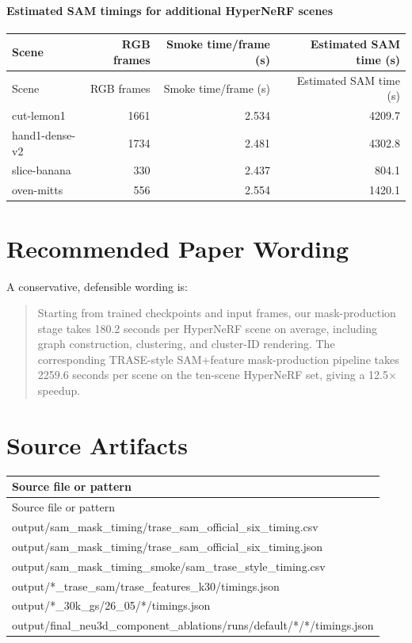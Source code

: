 \documentclass[10pt]{article}
\begin{document}
\paragraph{Estimated SAM timings for additional HyperNeRF scenes}
\small
\begin{longtable}{lrrr}
\toprule
Scene & RGB frames & Smoke time/frame (s) & Estimated SAM time (s) \\
\midrule
\endfirsthead
\toprule
Scene & RGB frames & Smoke time/frame (s) & Estimated SAM time (s) \\
\midrule
\endhead
cut-lemon1 & 1661 & 2.534 & 4209.7 \\
hand1-dense-v2 & 1734 & 2.481 & 4302.8 \\
slice-banana & 330 & 2.437 & 804.1 \\
oven-mitts & 556 & 2.554 & 1420.1 \\
\bottomrule
\end{longtable}
\normalsize

\section{Recommended Paper Wording}
A conservative, defensible wording is:

\begin{quote}
Starting from trained checkpoints and input frames, our mask-production stage takes 180.2 seconds per HyperNeRF scene on average, including graph construction, clustering, and cluster-ID rendering.  The corresponding TRASE-style SAM+feature mask-production pipeline takes 2259.6 seconds per scene on the ten-scene HyperNeRF set, giving a 12.5$\times$ speedup.
\end{quote}

\section{Source Artifacts}
\small
\begin{longtable}{p{15cm}}
\toprule
Source file or pattern \\
\midrule
\endfirsthead
\toprule
Source file or pattern \\
\midrule
\endhead
output/sam\_mask\_timing/trase\_sam\_official\_six\_timing.csv \\
output/sam\_mask\_timing/trase\_sam\_official\_six\_timing.json \\
output/sam\_mask\_timing\_smoke/sam\_trase\_style\_timing.csv \\
output/*\_trase\_sam/trase\_features\_k30/timings.json \\
output/*\_30k\_gs/26\_05/*/timings.json \\
output/final\_neu3d\_component\_ablations/runs/default/*/*/timings.json \\
\bottomrule
\end{longtable}
\normalsize
\end{document}
